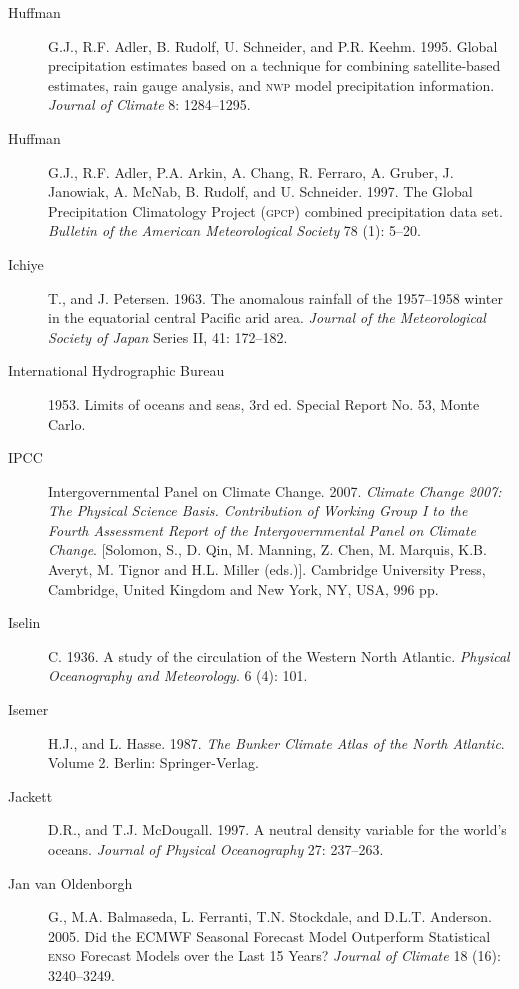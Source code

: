\begin{description}
\item [Huffman]G.J., R.F. Adler, B. Rudolf, U. Schneider, and
  P.R. Keehm. 1995.  Global precipitation estimates based on a
  technique for combining satellite-based estimates, rain gauge
  analysis, and \textsc{nwp} model precipitation
  information. \textit{Journal of Climate} 8: 1284--1295.

\item[Huffman]G.J., R.F. Adler, P.A. Arkin, A. Chang, R. Ferraro,
  A. Gruber, J.  Janowiak, A. McNab, B. Rudolf, and
  U. Schneider. 1997. The Global Precipitation Climatology Project
  (\textsc{gpcp}) combined precipitation data set.  \textit{Bulletin
    of the American Meteorological Society} 78 (1): 5--20.

\item [Ichiye]T., and J. Petersen. 1963. The anomalous rainfall of the
  1957--1958 winter in the equatorial central Pacific arid
  area. \textit{Journal of the Meteorological Society of Japan} Series
  II, 41: 172--182.

\item [International Hydrographic Bureau]1953. Limits of oceans and
  seas, 3rd ed. Special Report No. 53, Monte Carlo.

\item [IPCC] Intergovernmental Panel on Climate
  Change. 2007. \textit{Climate Change 2007: The Physical Science
    Basis. Contribution of Working Group I to the Fourth Assessment
    Report of the Intergovernmental Panel on Climate
    Change}. [Solomon, S., D. Qin, M. Manning, Z. Chen, M. Marquis,
    K.B. Averyt, M. Tignor and H.L. Miller (eds.)]. Cambridge
  University Press, Cambridge, United Kingdom and New York, NY, USA,
  996 pp.

\item [Iselin]C. 1936. A study of the circulation of the Western North
  Atlantic.  \textit{Physical Oceanography and Meteorology}. 6 (4):
  101.

\item [Isemer]H.J., and L. Hasse. 1987. \textit{The Bunker Climate
  Atlas of the North Atlantic}. Volume 2.  Berlin: Springer-Verlag.

\item [Jackett]D.R., and T.J. McDougall. 1997. A neutral density
  variable for the world's oceans. \textit{Journal of Physical
    Oceanography} 27: 237--263.

\item [Jan van Oldenborgh] G., M.A. Balmaseda, L. Ferranti,
  T.N. Stockdale, and D.L.T. Anderson. 2005. Did the ECMWF Seasonal
  Forecast Model Outperform Statistical \textsc{enso} Forecast Models
  over the Last 15 Years? \textit{Journal of Climate} 18 (16):
  3240--3249.


\end{description}
